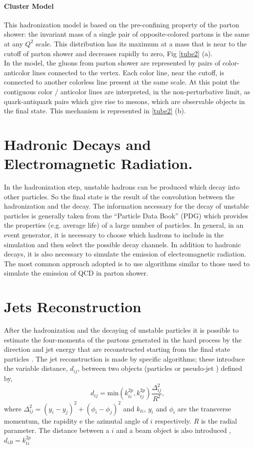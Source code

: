 \paragraph*{Cluster Model}  This  hadronization model  is based on the pre-confining property of the parton shower: the invariant mass of a single pair of opposite-colored partons is the same at any $ Q^2 $ scale. This distribution has its maximum at a mass that is near to the cutoff of parton shower and decreases rapidly to zero, Fig \ref{tube2} (a). \\
In the model, the gluons from parton shower are represented by pairs of color-anticolor lines connected to the vertex. Each color line, near the cutoff, is connected to another colorless line present at the same scale. At this point the contiguous color / anticolor lines are interpreted, in the non-perturbative limit, as quark-antiquark pairs which give rise to mesons, which are observable objects in the final state.
This mechanism is represented in \ref{tube2} (b).

\section{Hadronic Decays and  Electromagnetic   Radiation.}
In the hadronization step, unstable hadrons can be produced which decay into other particles. So the final state  is the result of the convolution between the  hadronization  and the decay. The information necessary for the decay of unstable particles  is generally taken from the  ``Particle Data Book'' (PDG) \cite{bib: pdg} which provides the properties (e.g. average life) of a large number of particles.
In general, in an event generator, it is necessary to choose which hadrons to include in the simulation and then select the possible decay channels. In addition to hadronic decays, it is also necessary to simulate the emission of electromagnetic radiation. The most common approach adopted is to use algorithms similar to those used to simulate the emission of QCD in parton shower.

\section{Jets Reconstruction} 
\label{rico_jet}
After the  hadronization and the decaying of  unstable particles it is possible to estimate the four-momenta of the partons generated in the hard process by the direction and jet energy  that are reconstructed starting from the final state particles  \cite{bib: run2jet, mass: in: dijet}.
The jet reconstruction  is made by specific algorithms; these introduce the variable distance, $ d_ {ij} $, between two objects (particles or pseudo-jet ) defined by,
\begin{equation}
d_{ij}=\mbox{min}( k_{ti}^{2p}, k_{tj}^{2p})  \frac{\Delta_{ij}^2}{R^2} \mbox{,}\end{equation}
where $\Delta_{ij}^2=(y_i - y_j)^2+ (\phi_i - \phi_j)^2$ and $k_{ti}$, $y_i$ and $\phi_i$ are  the transverse momentum, the rapidity  e the azimutal angle of $i$ respectively.  $R$ is the radial parameter. The distance between a $ i $ and a beam object is also introduced , $d_{iB}=k_{ti}^{2p}$ \\

